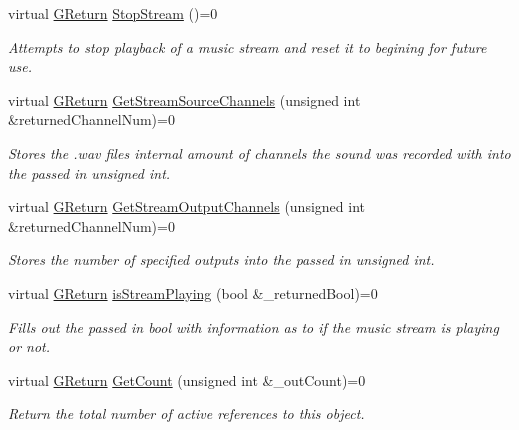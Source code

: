 \begin{DoxyCompactItemize}
virtual \mbox{\hyperlink{namespace_g_w_a67a839e3df7ea8a5c5686613a7a3de21}{G\+Return}} \mbox{\hyperlink{class_g_w_1_1_a_u_d_i_o_1_1_g_music_a7d0ecd391a9723426dd3a24df7db1ad8}{Stop\+Stream}} ()=0
\begin{DoxyCompactList}\small\item\em Attempts to stop playback of a music stream and reset it to begining for future use. \end{DoxyCompactList}\item 
virtual \mbox{\hyperlink{namespace_g_w_a67a839e3df7ea8a5c5686613a7a3de21}{G\+Return}} \mbox{\hyperlink{class_g_w_1_1_a_u_d_i_o_1_1_g_music_aef10f15b8487e18c2d65d1666ba64662}{Get\+Stream\+Source\+Channels}} (unsigned int \&returned\+Channel\+Num)=0
\begin{DoxyCompactList}\small\item\em Stores the .wav files internal amount of channels the sound was recorded with into the passed in unsigned int. \end{DoxyCompactList}\item 
virtual \mbox{\hyperlink{namespace_g_w_a67a839e3df7ea8a5c5686613a7a3de21}{G\+Return}} \mbox{\hyperlink{class_g_w_1_1_a_u_d_i_o_1_1_g_music_a750dcb654e813c322d7617e1a5ebdf93}{Get\+Stream\+Output\+Channels}} (unsigned int \&returned\+Channel\+Num)=0
\begin{DoxyCompactList}\small\item\em Stores the number of specified outputs into the passed in unsigned int. \end{DoxyCompactList}\item 
virtual \mbox{\hyperlink{namespace_g_w_a67a839e3df7ea8a5c5686613a7a3de21}{G\+Return}} \mbox{\hyperlink{class_g_w_1_1_a_u_d_i_o_1_1_g_music_a0a0f4d5e0d11f7aec7ed9a1a6371df1a}{is\+Stream\+Playing}} (bool \&\+\_\+returned\+Bool)=0
\begin{DoxyCompactList}\small\item\em Fills out the passed in bool with information as to if the music stream is playing or not. \end{DoxyCompactList}\item 
virtual \mbox{\hyperlink{namespace_g_w_a67a839e3df7ea8a5c5686613a7a3de21}{G\+Return}} \mbox{\hyperlink{class_g_w_1_1_a_u_d_i_o_1_1_g_music_ae41f54531b8325848215596fb2f821ac}{Get\+Count}} (unsigned int \&\+\_\+out\+Count)=0
\begin{DoxyCompactList}\small\item\em Return the total number of active references to this object. \end{DoxyCompactList}\item 

\end{DoxyCompactItemize}
